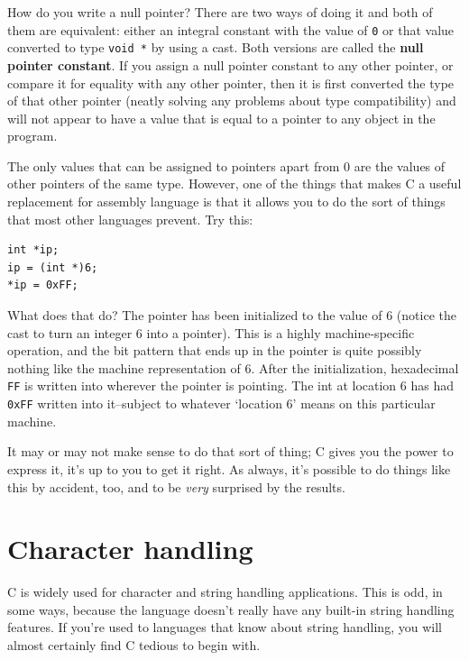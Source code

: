    How do you write a null pointer? There are two ways of doing it and
    both of them are equivalent: either an integral constant with the value
    of \texttt{0} or that value converted to type \texttt{void *} by
    using a cast. Both versions are called the \textbf{null pointer
    constant}. If you assign a null pointer constant to any other
    pointer, or compare it for equality with any other pointer, then it is
    first converted the type of that other pointer (neatly solving any
    problems about type compatibility) and will not appear to have a value
    that is equal to a pointer to any object in the program.


   The only values that can be assigned to pointers apart from 0 are the
    values of other pointers of the same type. However, one of the things
    that makes C a useful replacement for assembly language is that it
    allows you to do the sort of things that most other languages prevent.
    Try this:


   \begin{Verbatim}
int *ip;
ip = (int *)6;
*ip = 0xFF;
\end{Verbatim}

   What does that do? The pointer has been initialized to the value of
    6 (notice the cast to turn an integer 6 into a pointer). This is
    a highly machine-specific operation, and the bit pattern that ends up in
    the pointer is quite possibly nothing like the machine representation of
    6.  After the initialization, hexadecimal \texttt{FF} is written into
    wherever the pointer is pointing. The int at location 6 has had
    \texttt{0xFF} written into it--subject to whatever
    `location 6' means on this particular machine.


   It may or may not make sense to do that sort of thing; C gives you the
    power to express it, it's up to you to get it right. As always, it's
    possible to do things like this by accident, too, and to be
    \textit{very} surprised by the results.


  
        \section{Character handling}
        

  

  C is widely used for character and string handling applications. This
   is odd, in some ways, because the language doesn't really have any
   built-in string handling features. If you're used to languages that know
   about string handling, you will almost certainly find C tedious to begin
   with.


